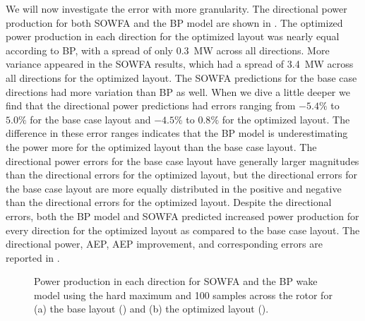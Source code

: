 \documentclass[conf]{new-aiaa}
\begin{document}
We will now investigate the error with more granularity. The directional power production for both SOWFA and the BP model are shown in . The optimized power production in each direction for the optimized layout was nearly equal according to BP, with a spread of only \SI[per-mode=symbol]{0.3}{\mega\watt} across all directions. More variance appeared in the SOWFA results, which had a spread of \SI[per-mode=symbol]{3.4}{\mega\watt} across all directions for the optimized layout. The SOWFA predictions for the base case directions had more variation than BP as well. When we dive a little deeper we find that the directional power predictions had errors ranging from $-5.4\%$ to $5.0\%$ for the base case layout and $-4.5\%$ to $0.8\%$ for the optimized layout. The difference in these error ranges indicates that the BP model is underestimating the power more for the optimized layout than the base case layout. The directional power errors for the base case layout have generally larger magnitudes than the directional errors for the optimized layout, but the directional errors for the base case layout are more equally distributed in the positive and negative than the directional errors for the optimized layout. Despite the directional errors, both the BP model and SOWFA predicted increased power production for every direction for the optimized layout as compared to the base case layout. The directional power, AEP, AEP improvement, and corresponding errors are reported in .
%
\begin{figure}[ht]
	\centering
	\caption{Power production in each direction for SOWFA and the BP wake model using the hard maximum and 100 samples across the rotor for (a) the base layout () and (b) the optimized layout ().}
	\label{fig:dir-power}
\end{figure}
\end{document}
